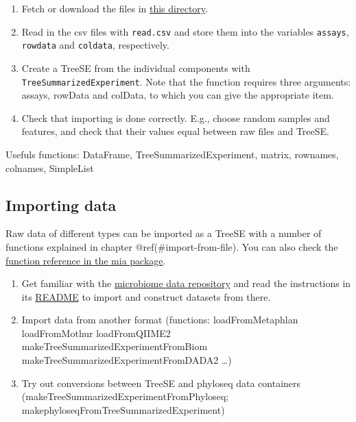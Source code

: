 \documentclass[
]{book}
\providecommand{\tightlist}{%
  \setlength{\itemsep}{0pt}\setlength{\parskip}{0pt}}
\begin{document}
\begin{enumerate}
\def\labelenumi{\arabic{enumi}.}
\tightlist
\item
  Fetch or download the files in \href{https://github.com/microbiome/data/tree/main/OKeefeDSData}{this directory}.
\item
  Read in the csv files with \texttt{read.csv} and store them into the variables
  \texttt{assays}, \texttt{rowdata} and \texttt{coldata}, respectively.
\item
  Create a TreeSE from the individual components with
  \texttt{TreeSummarizedExperiment}. Note that the function requires three arguments:
  assays, rowData and colData, to which you can give the appropriate item.
\item
  Check that importing is done correctly. E.g., choose random samples and
  features, and check that their values equal between raw files and TreeSE.
\end{enumerate}

Usefuls functions: DataFrame, TreeSummarizedExperiment, matrix, rownames, colnames, SimpleList

\hypertarget{importing-data}{%
\subsection{Importing data}\label{importing-data}}

Raw data of different types can be imported as a TreeSE with a number of
functions explained in chapter @ref(\#import-from-file). You can also check the
\href{https://microbiome.github.io/mia/reference/index.html}{function reference in the mia package}.

\begin{enumerate}
\def\labelenumi{\arabic{enumi}.}
\tightlist
\item
  Get familiar with the
  \href{https://github.com/microbiome/data}{microbiome data repository}
  and read the instructions in its
  \href{https://github.com/microbiome/data\#training-microbiome-datasets}{README}
  to import and construct datasets from there.
\item
  Import data from another format (functions: loadFromMetaphlan \textbar{} loadFromMothur \textbar{} loadFromQIIME2 \textbar{} makeTreeSummarizedExperimentFromBiom \textbar{} makeTreeSummarizedExperimentFromDADA2 \ldots)
\item
  Try out conversions between TreeSE and phyloseq data containers (makeTreeSummarizedExperimentFromPhyloseq; makephyloseqFromTreeSummarizedExperiment)
\end{enumerate}
\end{document}
